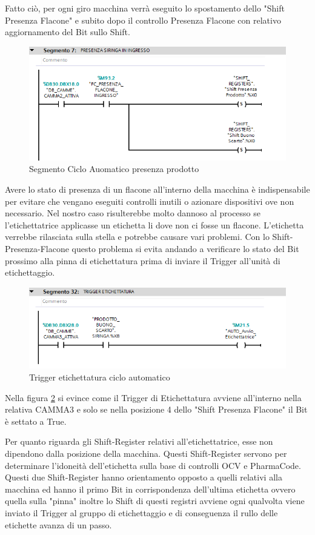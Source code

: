 \documentclass[12pt, a4paper, oneside]{book}
\begin{document}
Fatto ciò, per ogni giro macchina verrà eseguito lo spostamento dello "Shift  Presenza Flacone" e subito dopo il controllo Presenza Flacone con relativo aggiornamento del Bit sullo Shift.

\begin{figure}[H]
	\centering
	\includegraphics[width=12cm]{Immagini/SH4}
	\caption{ Segmento Ciclo Auomatico presenza prodotto}
	\label{sh4}
\end{figure}

Avere lo stato di presenza di un flacone all'interno della macchina è indispensabile per evitare che vengano eseguiti controlli inutili o azionare dispositivi ove non necessario. Nel nostro caso risulterebbe molto dannoso al processo se l'etichettatrice applicasse un etichetta li dove non ci fosse un flacone. L'etichetta verrebbe rilasciata sulla stella e potrebbe causare vari problemi. Con lo Shift-Presenza-Flacone questo problema si evita andando a verificare lo stato del Bit prossimo alla pinna di etichettatura prima di inviare il Trigger all'unità di etichettaggio. 

\begin{figure}[H]
	\centering
	\includegraphics[width=12cm]{Immagini/SH5}
	\caption{Trigger etichettatura ciclo automatico}
	\label{sh5}
\end{figure}

Nella figura \ref{sh5} si evince come il Trigger di Etichettatura avviene all'interno nella relativa CAMMA3 e solo se nella posizione 4 dello "Shift Presenza Flacone" il Bit è settato a True.

Per quanto riguarda gli Shift-Register relativi all'etichettatrice, esse non dipendono dalla posizione della macchina. Questi Shift-Register servono per determinare l'idoneità dell'etichetta sulla base di controlli OCV e PharmaCode.
Questi due Shift-Register hanno orientamento opposto a quelli relativi alla macchina ed hanno il primo Bit in corrispondenza dell'ultima etichetta ovvero quella sulla "pinna" inoltre lo Shift di questi registri avviene ogni qualvolta viene inviato il Trigger al gruppo di etichettaggio e di conseguenza il rullo delle etichette avanza di un passo. 
\end{document}
